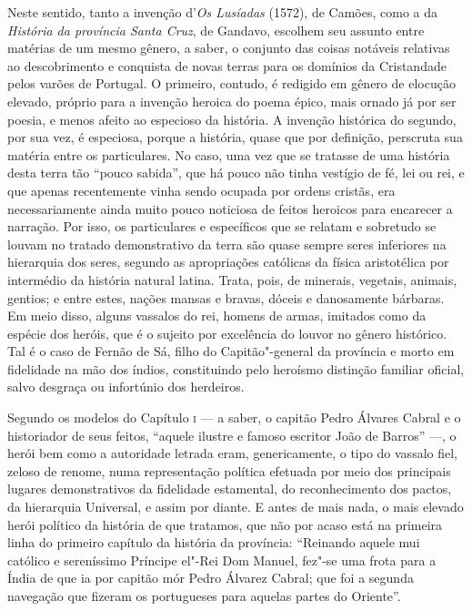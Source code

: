 Neste sentido, tanto a invenção d'\textit{Os Lusíadas} (1572),
de Camões, como a da \textit{História da província Santa Cruz}, de Gandavo,
escolhem seu assunto entre matérias de um mesmo gênero, a saber, o
conjunto das coisas notáveis relativas ao descobrimento e conquista de
novas terras para os domínios da Cristandade pelos varões de Portugal.
O primeiro, contudo, é redigido em gênero de elocução elevado, próprio
para a invenção heroica do poema épico, mais ornado já por ser poesia,
e menos afeito ao especioso da história. A invenção histórica do
segundo, por sua vez, é especiosa, porque a história, quase que por
definição, perscruta sua matéria entre os particulares. No caso, uma
vez que se tratasse de uma história desta terra tão
``pouco sabida'', que há pouco não tinha vestígio de fé, lei ou rei, 
e que apenas recentemente vinha sendo
ocupada por ordens cristãs, era necessariamente ainda muito pouco
noticiosa de feitos heroicos para encarecer a narração. Por isso, os
particulares e específicos que se relatam e sobretudo se louvam no
tratado demonstrativo da terra são quase sempre seres inferiores na
hierarquia dos seres, segundo as apropriações católicas da física
aristotélica por intermédio da história natural latina. Trata, pois, de
minerais, vegetais, animais, gentios; e entre estes, nações mansas e
bravas, dóceis e danosamente bárbaras. Em meio disso, alguns vassalos
do rei, homens de armas, imitados como da espécie dos heróis, que é o
sujeito por excelência do louvor no gênero histórico. Tal é o caso de
Fernão de Sá, filho do Capitão"-general da província e morto em
fidelidade na mão dos índios, constituindo pelo heroísmo distinção
familiar oficial, salvo desgraça ou infortúnio dos herdeiros.

Segundo os modelos do Capítulo \textsc{i} --- a saber, o capitão Pedro Álvares Cabral
e o historiador de seus feitos, ``aquele ilustre e famoso
escritor João de Barros'' ---, o herói bem como a autoridade
letrada eram, genericamente, o tipo do vassalo fiel, zeloso de renome,
numa representação política efetuada por meio dos principais lugares
demonstrativos da fidelidade estamental, do reconhecimento dos pactos,
da hierarquia Universal, e assim por diante. E antes de mais nada, o
mais elevado herói político da história de que tratamos, que não por
acaso está na primeira linha do primeiro capítulo da história da
província: ``Reinando aquele mui católico e sereníssimo
Príncipe el"-Rei Dom Manuel, fez"-se uma frota para a Índia de que ia por
capitão mór Pedro Álvarez Cabral; que foi a segunda navegação que fizeram
os portugueses para aquelas partes do Oriente''.

